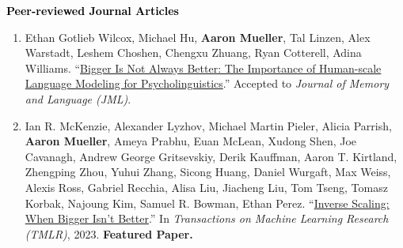 \documentclass[10pt]{article}
\renewcommand{\subsection}[1]{\textcolor{black}{#1}}
\newcommand{\halfblankline}{\quad\vspace{-0.5\baselineskip}\pagebreak[3]}
\providecommand*\titlelink[2]{\href{#1}{\textcolor{accent}{#2}}}
\begin{document}
	\subsection{\textbf{Peer-reviewed Journal Articles}}
	\begin{enumerate}[leftmargin=*, topsep=0pt, itemsep=0.25ex, partopsep=0ex, parsep=1ex, label=J\arabic*., ref=J\arabic*]

	\item Ethan Gotlieb Wilcox, Michael Hu, \textbf{Aaron Mueller}, Tal Linzen, Alex Warstadt, Leshem Choshen, Chengxu Zhuang, Ryan Cotterell, Adina Williams. ``\titlelink{https://osf.io/preprints/psyarxiv/rfwgd}{Bigger Is Not Always Better: The Importance of Human-scale Language Modeling for Psycholinguistics}.'' Accepted to \emph{Journal of Memory and Language (JML)}.

	\item Ian R. McKenzie, Alexander Lyzhov, Michael Martin Pieler, Alicia Parrish, \textbf{Aaron Mueller}, Ameya Prabhu, Euan McLean, Xudong Shen, Joe Cavanagh, Andrew George Gritsevskiy, Derik Kauffman, Aaron T. Kirtland, Zhengping Zhou, Yuhui Zhang, Sicong Huang, Daniel Wurgaft, Max Weiss, Alexis Ross, Gabriel Recchia, Alisa Liu, Jiacheng Liu, Tom Tseng, Tomasz Korbak, Najoung Kim, Samuel R. Bowman, Ethan Perez. ``\titlelink{https://arxiv.org/abs/2306.09479}{Inverse Scaling: When Bigger Isn't Better}.'' In \emph{Transactions on Machine Learning Research (TMLR)}, 2023. \textbf{\textcolor{accent}{Featured Paper.}}

	\end{enumerate}

	\halfblankline
\end{document}
